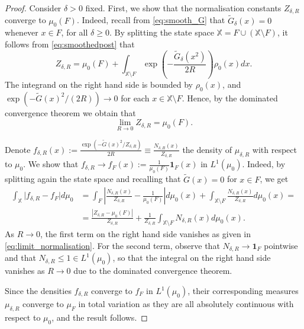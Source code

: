 \documentclass[a4paper]{article}
\numberwithin{equation}{section}
\begin{document}
\begin{proof}

Consider $\delta>0$ fixed. First, we show that the normalisation constants $Z_{\delta,R}$ converge to $\mu_0(F)$. Indeed, recall from \eqref{eq:smooth_G} that $\tilde{G}_\delta(x)=0$ whenever $x\in F$, for all $\delta\geq 0$. By splitting the state space $\mathbb{X}=F \cup (\mathbb X \setminus F)$, it follows from \eqref{eq:smoothedpost} that
\[
    Z_{\delta,R} = \mu_0(F) + \int_{\mathbb X \setminus F} \exp\left( -\frac{\tilde{G}_\delta(x^2)}{2R} \right) \rho_0(x)dx.
\]
The integrand on the right hand side is bounded by $\rho_0(x)$, and $\exp(-\tilde{G}(x)^2/(2R))\rightarrow 0$ for each $x\in \mathbb{X}\setminus F$. Hence, by the dominated convergence theorem we obtain that
\begin{equation}
    \label{eq:limit_normalisation}
        \lim_{R\rightarrow 0} Z_{\delta,R}=\mu_0(F).
\end{equation}

Denote $f_{\delta,R}(x):=\frac{\exp\left(- \tilde{G}(x)^2/Z_{\delta,R}\right)}{2R}\equiv \frac{N_{\delta,R}(x)}{Z_{\delta,R}}$ the density of $\mu_{\delta,R}$ with respect to $\mu_0$. We show that $f_{\delta,R}\rightarrow f_F(x):= \frac{1}{\mu_0(F)}\mathbf{1}_F(x)$ in $L^1(\mu_0)$. Indeed, by splitting again the state space and recalling that $\tilde G(x)=0$ for $x\in F$, we get
\begin{align*}
    \int_{\mathbb X}\vert f_{\delta,R}-f_F \vert d\mu_0 & = \int_F \left\vert \frac{N_{\delta,R}(x)}{Z_{\delta,R}} - \frac{1}{\mu_0(F)}\right\vert d\mu_0(x) + \int_{\mathbb X \setminus F} \frac{N_{\delta, R}(x)}{Z_{\delta,R}}d\mu_0(x)= \\
    &= \frac{\left\vert Z_{\delta,R}-\mu_0(F) \right\vert}{Z_{\delta,R}}+ \frac{1}{Z_{\delta,R}}\int_{\mathbb{X}\setminus F}N_{\delta,R}(x)d\mu_0(x).
\end{align*}
As $R\rightarrow 0$, the first term on the right hand side vanishes as given in \eqref{eq:limit_normalisation}. For the second term, observe that $N_{\delta,R}\rightarrow \mathbf{1}_F$ pointwise and that $N_{\delta,R}\leq 1 \in L^1(\mu_0)$, so that the integral on the right hand side vanishes as $R\rightarrow 0$ due to the dominated convergence theorem. 

Since the densities $f_{\delta,R}$ converge to $f_F$ in $L^1(\mu_0)$, their corresponding measures $\mu_{\delta,R}$ converge to $\mu_F$ in total variation as they are all absolutely continuous with respect to $\mu_0$, and the result follows.
\end{proof}
\end{document}
